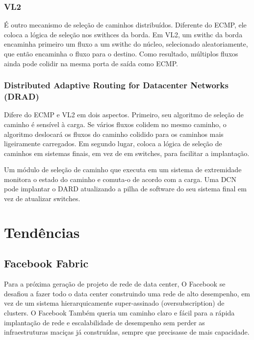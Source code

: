 \documentclass[12pt,a4paper]{report}
\begin{document}
\subsection{VL2}

  É outro mecanismo de seleção de caminhos distribuídos. Diferente do ECMP,
  ele coloca a lógica de seleção nos swithces da borda. Em VL2, um swithc da borda
  encaminha primeiro um fluxo a um swithc do núcleo, selecionado aleatoriamente, que
  então encaminha o fluxo para o destino. Como resultado, múltiplos fluxos
  ainda pode colidir na mesma porta de saída como ECMP.

\subsection{Distributed Adaptive Routing for Datacenter Networks (DRAD)}

Difere do ECMP e VL2 em dois aspectos. Primeiro, seu algoritmo de seleção de caminho é
sensível à carga. Se vários fluxos colidem no mesmo caminho, o algoritmo deslocará os fluxos do caminho colidido
para os caminhos mais ligeiramente carregados. Em segundo lugar, coloca a lógica de seleção de
caminhos em sistemas finais, em vez de em switches, para facilitar a implantação. 

Um módulo de seleção de caminho que executa em um sistema de extremidade monitora
o estado do caminho e comuta-o de acordo com a carga. 
Uma DCN pode implantar o DARD atualizando a pilha de software do seu sistema final em vez de atualizar switches.

\chapter{Tendências}

\section{Facebook Fabric}






Para a próxima geração de projeto de rede de data center, O Facebook se desafiou a fazer todo o data center construindo uma rede de alto desempenho, em vez de um sistema hierarquicamente super-assinado (oversubscription) de clusters. 
O Facebook Também queria um caminho claro e fácil para a rápida implantação de rede e escalabilidade de desempenho sem perder as
infraestruturas maciças já construídas, sempre que precisasse de mais capacidade.
\end{document}
